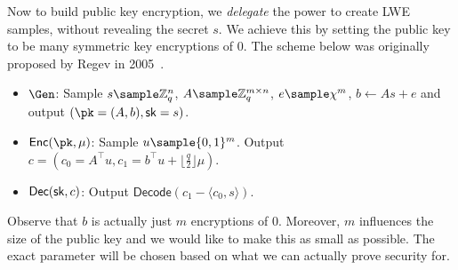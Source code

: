 Now to build public key encryption, we \emph{delegate} the power to create LWE samples, without revealing the secret $s$. We achieve this by setting the public key to be many symmetric key encryptions of $0$. The scheme below was originally proposed by Regev in 2005~\cite{STOC:Regev05}.

\begin{itemize}
    \item $\Gen$: Sample $s \sample \mathbb{Z}_q^n$, $A \sample \mathbb{Z}_q^{m \times n}$, $e \sample \chi^m$, $b \gets As + e$ and output $(\pk = (A,b), \sk = s)$.
    \item $\Enc(\pk, \mu)$: Sample $u \sample \{0,1\}^m$. Output $c = (c_0 = A^\intercal u,c_1 =  b^\intercal u + \lfloor\frac{q}{2}\rfloor\mu)$.
    \item $\mathsf{Dec}(\mathsf{sk}, c)$: Output $\mathsf{Decode}(c_1 - \langle c_0, s\rangle)$.
\end{itemize}

Observe that $b$ is actually just $m$ encryptions of $0$. Moreover, $m$ influences the size of the public key and we would like to make this as small as possible. The exact parameter will be chosen based on what we can actually prove security for.

